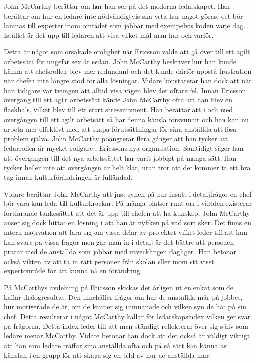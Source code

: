 John McCarthy berättar om hur han ser på det moderna ledarskapet. Han berättar om hur en ledare inte nödvändigtvis ska veta hur något göras, det bör lämnas till experter inom området som jobbar med exempelvis koden varje dag. Istället är det upp till ledaren att  visa vilket mål man har och varför.

Detta är något som orsakade orolighet när Ericsson valde att gå över till ett agilt arbetssätt för ungefär sex år sedan. John McCarthy beskriver hur han kunde känna att chefsrollen blev mer redundant och det kunde därför uppstå frustration när chefen inte längre stod för alla lösningar. Vidare konstaterar han dock att när han tidigare var tvungen att alltid visa vägen blev det oftare fel. Innan Ericsson övergång till ett agilt arbetssätt kände John McCarthy ofta att han blev en flaskhals, vilket blev till ett stort stressmoment. Han berättar att i och med övergången till ett agilt arbetsätt så har denna känsla försvunnit och han kan nu arbeta mer effektivt med att skapa förutsättningar för sina anställda att lösa problem själva. John McCarthy poängterar flera gånger att han tycker att ledarrollen är mycket roligare i Ericssons nya organisation. Samtidigt säger han att övergången till det nya arbetssättet har varit jobbigt på många sätt. Han tycker heller inte att övergången är helt klar, utan tror att det kommer ta ett bra tag innan kulturförändringen är fulländad.

Vidare berättar John McCarthy att just synen på hur insatt i detaljfrågor en chef bör vara kan leda till kulturkrockar. På många platser runt om i världen existerar fortfarande tankesättet att det är upp till chefen att ha kunskap. John McCarthy anser sig dock hittat en lösning i att han är nyfiken på vad som sker. Det finns en intern motivation att lära sig om vissa delar av projektet vilket leder till att han kan svara på vissa frågor men går man in i detalj är det bättre att personen pratar med de anställda som jobbar med utvecklingen dagligen. Han betonar också vikten av att ta in rätt personer från skolan eller inom ett visst expertområde för att kunna nå en förändring.

På McCarthys avdelning på Ericsson skickas det årligen ut en enkät som de kallar dialogresultat. Den innehåller frågor om hur de anställda mår på jobbet, hur motiverade de är, om de känner sig utmnanade och vilken syn de har på sin chef. Detta resulterar i något McCarthy kallar för ledarskapsindex vilken ger svar på frågorna. Detta index leder till att man ständigt reflekterar över sig själv som ledare menar McCarthy. Vidare betonar han dock att det också är väldigt viktigt att han som ledare träffar sina anställda ofta och på så sätt kan känna av känslan i en grupp för att skapa sig en bild av hur de anställda mår.